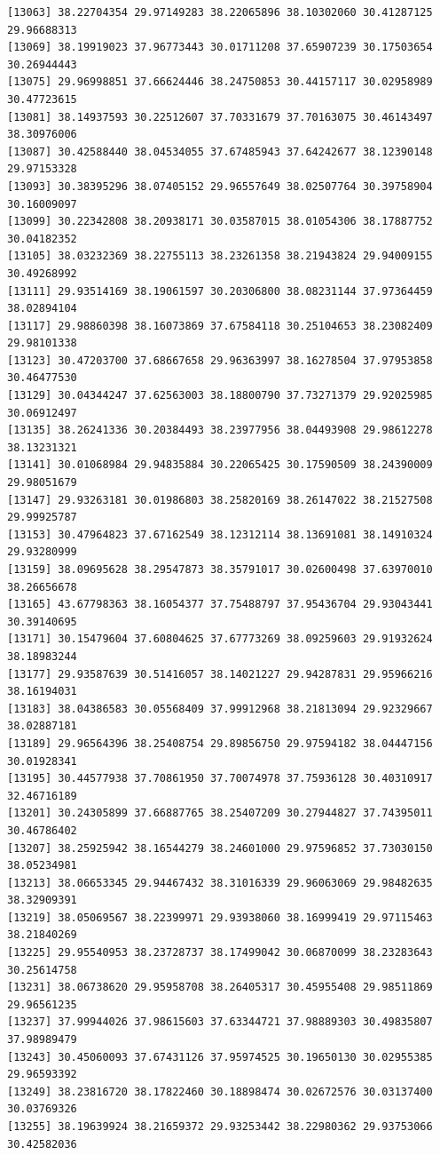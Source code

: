 \documentclass[
  letterpaper,
  DIV=11,
  numbers=noendperiod]{scrartcl}
\begin{document}
\begin{verbatim}
[13063] 38.22704354 29.97149283 38.22065896 38.10302060 30.41287125 29.96688313
[13069] 38.19919023 37.96773443 30.01711208 37.65907239 30.17503654 30.26944443
[13075] 29.96998851 37.66624446 38.24750853 30.44157117 30.02958989 30.47723615
[13081] 38.14937593 30.22512607 37.70331679 37.70163075 30.46143497 38.30976006
[13087] 30.42588440 38.04534055 37.67485943 37.64242677 38.12390148 29.97153328
[13093] 30.38395296 38.07405152 29.96557649 38.02507764 30.39758904 30.16009097
[13099] 30.22342808 38.20938171 30.03587015 38.01054306 38.17887752 30.04182352
[13105] 38.03232369 38.22755113 38.23261358 38.21943824 29.94009155 30.49268992
[13111] 29.93514169 38.19061597 30.20306800 38.08231144 37.97364459 38.02894104
[13117] 29.98860398 38.16073869 37.67584118 30.25104653 38.23082409 29.98101338
[13123] 30.47203700 37.68667658 29.96363997 38.16278504 37.97953858 30.46477530
[13129] 30.04344247 37.62563003 38.18800790 37.73271379 29.92025985 30.06912497
[13135] 38.26241336 30.20384493 38.23977956 38.04493908 29.98612278 38.13231321
[13141] 30.01068984 29.94835884 30.22065425 30.17590509 38.24390009 29.98051679
[13147] 29.93263181 30.01986803 38.25820169 38.26147022 38.21527508 29.99925787
[13153] 30.47964823 37.67162549 38.12312114 38.13691081 38.14910324 29.93280999
[13159] 38.09695628 38.29547873 38.35791017 30.02600498 37.63970010 38.26656678
[13165] 43.67798363 38.16054377 37.75488797 37.95436704 29.93043441 30.39140695
[13171] 30.15479604 37.60804625 37.67773269 38.09259603 29.91932624 38.18983244
[13177] 29.93587639 30.51416057 38.14021227 29.94287831 29.95966216 38.16194031
[13183] 38.04386583 30.05568409 37.99912968 38.21813094 29.92329667 38.02887181
[13189] 29.96564396 38.25408754 29.89856750 29.97594182 38.04447156 30.01928341
[13195] 30.44577938 37.70861950 37.70074978 37.75936128 30.40310917 32.46716189
[13201] 30.24305899 37.66887765 38.25407209 30.27944827 37.74395011 30.46786402
[13207] 38.25925942 38.16544279 38.24601000 29.97596852 37.73030150 38.05234981
[13213] 38.06653345 29.94467432 38.31016339 29.96063069 29.98482635 38.32909391
[13219] 38.05069567 38.22399971 29.93938060 38.16999419 29.97115463 38.21840269
[13225] 29.95540953 38.23728737 38.17499042 30.06870099 38.23283643 30.25614758
[13231] 38.06738620 29.95958708 38.26405317 30.45955408 29.98511869 29.96561235
[13237] 37.99944026 37.98615603 37.63344721 37.98889303 30.49835807 37.98989479
[13243] 30.45060093 37.67431126 37.95974525 30.19650130 30.02955385 29.96593392
[13249] 38.23816720 38.17822460 30.18898474 30.02672576 30.03137400 30.03769326
[13255] 38.19639924 38.21659372 29.93253442 38.22980362 29.93753066 30.42582036

\end{verbatim}
\end{document}
